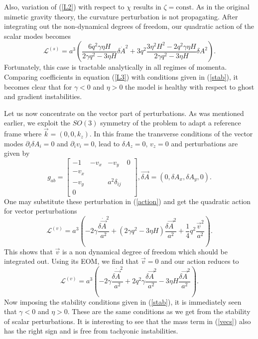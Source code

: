 \documentclass[%
 reprint,
 amsmath,amssymb,
 aps,
]{revtex4-1}
\begin{document}
Also, variation of (\ref{L2}) with respect to $\chi$ results in $\zeta=\mbox{const}$. As in the original mimetic gravity theory, the curvature perturbation is not propagating. After integrating out the non-dynamical degrees of freedom, our quadratic action of the scalar modes becomes
\begin{equation}\label{L3}
\mathcal{L}^{(s)}= a^3\left(\frac{6 q^2\gamma\eta H}{2\gamma q^2-3\eta H}\delta\dot{A}^2+3q^2\frac{3\eta^2H^2-2q^2\gamma\eta H}{2\gamma q^2-3\eta H}\delta A^2\right).
\end{equation}
Fortunately, this case is tractable analytically in all regimes of momenta.  Comparing coefficients in equation (\ref{L3}) with conditions given in (\ref{stab}), it becomes clear that for $\gamma<0$ and $\eta>0$ the model is healthy with respect to ghost and gradient instabilities.

Let us now concentrate on the vector part of perturbations. As was mentioned earlier, we exploit the $SO(3)$ symmetry of the problem to adapt a reference frame where $\vec{k}=(0,0,k_z)$. In this frame the transverse conditions of the vector modes $\partial_i\delta A_i=0$ and $\partial_i v_i=0$, lead to $\delta A_z=0$, $v_z=0$ and perturbations are given by
\begin{equation}
g_{ab}=
\begin{bmatrix}
-1         & -v_x    &-v_y               & 0\\
-v_x       &         &                   &  \\
-v_y       &         & a^2 \delta_{ij}   &  \\
 0         &         &                   &
\end{bmatrix},
\vec{\delta A}=(0,\delta A_x,\delta A_y,0).
\end{equation}
One may substitute these perturbation in (\ref{action}) and get the quadratic action for vector perturbations
\begin{equation}
\mathcal{L}^{(v)}=a^3 \left(-2\gamma\frac{\delta\dot{\vec{A}}^2}{a^2}+(2\gamma q^2-3\eta H)\frac{\delta\vec{A}^2}{a^2}+\frac{1}{4}q^2\frac{\vec{v}^2}{a^2}\right).
\end{equation}
This shows that $\vec{v}$ is a non dynamical degree of freedom which should be integrated out. Using its EOM, we find that $\vec{v}=0$ and our action reduces to
\begin{equation}\label{vecs}
\mathcal{L}^{(v)}=a^3\left(-2\gamma \frac{\delta\dot{\vec{A}}^2}{a^2}+2 q^2\gamma \frac{\delta\vec{A}^2}{a^2}-3\eta H \frac{\delta\vec{A}^2}{a^2}\right).
\end{equation}
Now imposing the stability conditions given in (\ref{stab}), it is immediately seen that $\gamma<0$ and $\eta>0$. These are the same conditions as we get from the stability of scalar perturbations. It is interesting to see that the mass term in (\ref{vecs}) also has the right sign and is free from tachyonic instabilities.
\end{document}
